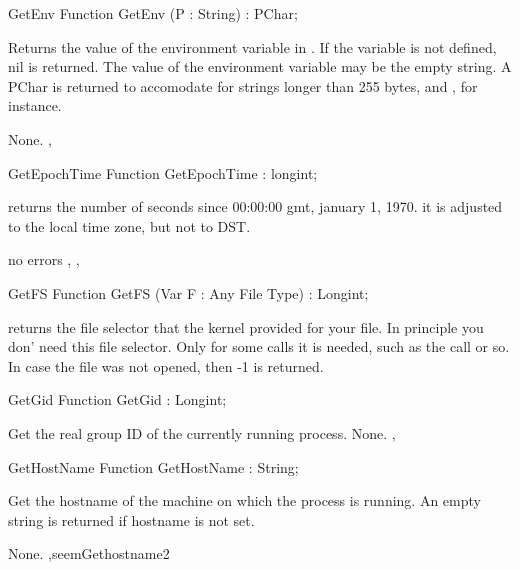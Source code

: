 \html{}
\begin{function}{GetEnv}
\Declaration
Function GetEnv (P : String) : PChar;

\Description
Returns the value of the environment variable in . If the variable is
not defined, nil is returned. The value of the environment variable may be
the empty string.
A PChar is returned to accomodate for strings longer than 255 bytes,
 and , for instance.

\Errors
None.
\SeeAlso
{},  
\end{function}
\html{}
\begin{function}{GetEpochTime}
\Declaration
Function GetEpochTime  : longint;

\Description

returns the number of seconds since 00:00:00 gmt, january 1, 1970.
it is adjusted to the local time zone, but not to DST.

\Errors
no errors
\SeeAlso
{}, , 
\end{function}
\html{}
\begin{function}{GetFS}
\Declaration
Function GetFS (Var F : Any File Type) : Longint;

\Description
{} returns the file selector that the kernel provided for your
file. In principle you don' need this file selector. Only for some calls
it is needed, such as the  call or so.
\Errors
In case the file was not opened, then -1 is returned.
\SeeAlso
{}
\end{function}
\html{}
\begin{function}{GetGid}
\Declaration
Function GetGid  : Longint;

\Description
 Get the real group ID of the currently running process.
\Errors
None.
\SeeAlso
{},  
\end{function}
\html{}
\begin{function}{GetHostName}
\Declaration
Function GetHostName  : String;

\Description

Get the hostname of the machine on which the process is running.
An empty string is returned if hostname is not set.

\Errors
None.
\SeeAlso
 ,seem{Gethostname}{2} 
\end{function}
